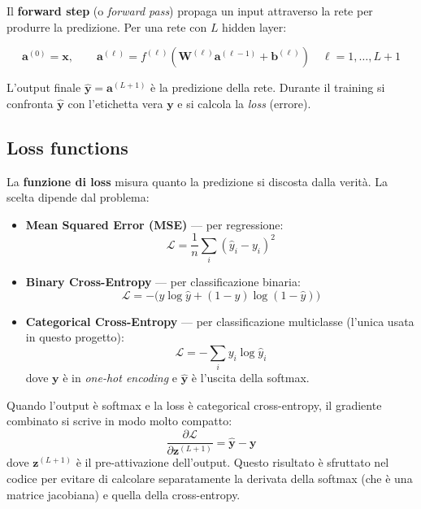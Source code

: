 \documentclass[11pt,a4paper]{article}
\begin{document}
Il \textbf{forward step} (o \emph{forward pass}) propaga un input
attraverso la rete per produrre la predizione. Per una rete con $L$
hidden layer:

\begin{equation}
    \bm{a}^{(0)} = \bm{x}, \qquad
    \bm{a}^{(\ell)} = f^{(\ell)}\!\left(\bm{W}^{(\ell)}\bm{a}^{(\ell-1)} + \bm{b}^{(\ell)}\right)
    \quad \ell = 1, \ldots, L+1
\end{equation}

L'output finale $\hat{\bm{y}} = \bm{a}^{(L+1)}$ è la predizione della rete.
Durante il training si confronta $\hat{\bm{y}}$ con l'etichetta vera $\bm{y}$
e si calcola la \emph{loss} (errore).

\subsection{Loss functions}

La \textbf{funzione di loss} misura quanto la predizione si discosta dalla
verità. La scelta dipende dal problema:

\begin{itemize}
    \item \textbf{Mean Squared Error (MSE)} --- per regressione:
        \[ \mathcal{L} = \frac{1}{n}\sum_i (\hat{y}_i - y_i)^2 \]
    \item \textbf{Binary Cross-Entropy} --- per classificazione binaria:
        \[ \mathcal{L} = -\bigl(y\log\hat{y} + (1-y)\log(1-\hat{y})\bigr) \]
    \item \textbf{Categorical Cross-Entropy} --- per classificazione
        multiclasse (l'unica usata in questo progetto):
        \[ \mathcal{L} = -\sum_i y_i\log\hat{y}_i \]
        dove $\bm{y}$ è in \emph{one-hot encoding} e $\hat{\bm{y}}$ è
        l'uscita della softmax.
\end{itemize}

\begin{concetto}
Quando l'output è softmax e la loss è categorical cross-entropy, il
gradiente combinato si scrive in modo molto compatto:
\[
    \frac{\partial \mathcal{L}}{\partial \bm{z}^{(L+1)}} = \hat{\bm{y}} - \bm{y}
\]
dove $\bm{z}^{(L+1)}$ è il pre-attivazione dell'output. Questo risultato è
sfruttato nel codice per evitare di calcolare separatamente la derivata
della softmax (che è una matrice jacobiana) e quella della cross-entropy.
\end{concetto}
\end{document}
